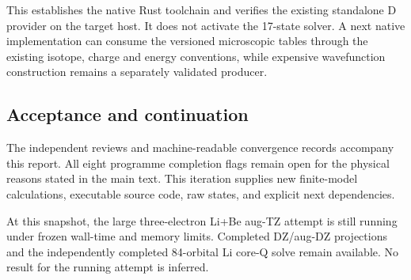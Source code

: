 \documentclass[
  10pt,
]{article}
\begin{document}
This establishes the native Rust toolchain and verifies the existing
standalone D provider on the target host. It does not activate the
17-state solver. A next native implementation can consume the versioned
microscopic tables through the existing isotope, charge and energy
conventions, while expensive wavefunction construction remains a
separately validated producer.

\hypertarget{acceptance-and-continuation}{%
\subsection{Acceptance and
continuation}\label{acceptance-and-continuation}}

The independent reviews and machine-readable convergence records
accompany this report. All eight programme completion flags remain open
for the physical reasons stated in the main text. This iteration
supplies new finite-model calculations, executable source code, raw
states, and explicit next dependencies.

At this snapshot, the large three-electron Li+Be aug-TZ attempt is still
running under frozen wall-time and memory limits. Completed DZ/aug-DZ
projections and the independently completed 84-orbital Li core-Q solve
remain available. No result for the running attempt is inferred.
\end{document}
